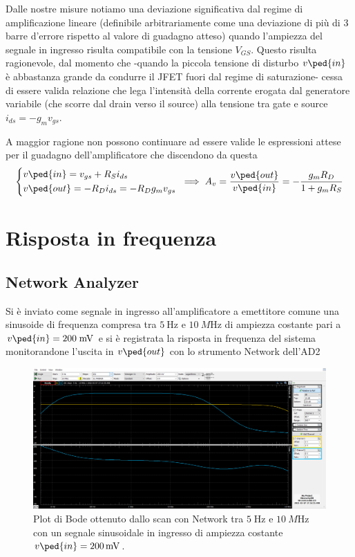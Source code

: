 \documentclass[10pt, a4paper, italian]{article}
\begin{document}
Dalle nostre misure notiamo una deviazione significativa dal regime di
amplificazione lineare (definibile arbitrariamente come una deviazione di più
di 3 barre d'errore rispetto al valore di guadagno atteso) quando l'ampiezza
del segnale in ingresso risulta compatibile con la tensione $V_{GS}$. Questo
risulta ragionevole, dal momento che -quando la piccola tensione di disturbo
$v\ped{in}$ è abbastanza grande da condurre il JFET fuori dal regime di
saturazione- cessa di essere valida relazione che lega l'intensità della
corrente erogata dal generatore variabile (che scorre dal drain verso il
source) alla tensione tra gate e source $i_{ds} = -g_m v_{gs}$.

A maggior ragione non possono continuare ad essere valide le espressioni
attese per il guadagno dell'amplificatore che discendono da questa
\[
\begin{dcases}
v\ped{in} = v_{gs} + R_S i_{ds} \\
%
v\ped{out} = - R_D i_{ds} = - R_D g_m v_{gs} \\
\end{dcases}
\: \implies A_v = \frac{v\ped{out}}{v\ped{in}} =
- \frac{g_m R_D}{1 + g_m R_S}
\]
\section{Risposta in frequenza}
\subsection{Network Analyzer}
Si è inviato come segnale in ingresso all'amplificatore a emettitore comune una
sinusoide di frequenza compresa tra $\SI{5}{\Hz}$ e $\SI{10}{M\Hz}$ di
ampiezza costante pari a $v\ped{in} = 200 \; \si{m\V}$ e si è registrata la
risposta in frequenza del sistema monitorandone l'uscita in $v\ped{out}$ con
lo strumento Network dell'AD2
\begin{figure}[htbp]
    \centering
	\includegraphics[width=\textwidth]{net}
    \caption{Plot di Bode ottenuto dallo scan con Network tra $5 \; \si{\Hz}$ e
$\SI{10}{M\Hz}$ con un segnale sinusoidale in ingresso di ampiezza costante
$v\ped{in} = \SI{200}{m\V}$. \label{fig: bodeplot}}
\end{figure}
\end{document}
